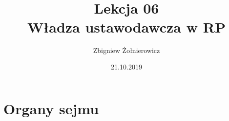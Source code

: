 \documentclass[a4paper]{article}
\begin{document}
\title{{\huge Lekcja 06} \\
{\large Władza ustawodawcza w RP}}
\author{Zbigniew Żołnierowicz}
\date{21.10.2019}
\maketitle
\section{Organy sejmu}
\end{document}
